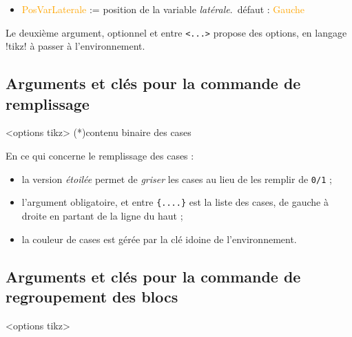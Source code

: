 \documentclass[french,a4paper,11pt]{article}
\newcommand\Cle[1]{{\small\sffamily\textlangle \textcolor{orange}{#1}\textrangle}}
\begin{document}
{\begin{tipblock}
\begin{itemize}
	\hfill~défaut : \Cle{black}
	\item \Cle{PosVarLaterale} := position de la variable \textit{latérale}.\hfill~défaut : \Cle{Gauche}
\end{itemize}

Le deuxième argument, optionnel et entre \texttt{<...>} propose des options, en langage \packagetex!tikz! à passer à l'environnement.
\end{tipblock}

\subsection{Arguments et clés pour la commande de remplissage}

\begin{DemoCode}
\begin{TableKarnaugh}[clés]<options tikz>
	\KarnaughCasesResult(*){contenu binaire des cases}
\end{TableKarnaugh}
\end{DemoCode}

\begin{tipblock}
En ce qui concerne le remplissage des cases :

\begin{itemize}
	\item la version \textit{étoilée} permet de \textit{griser} les cases au lieu de les remplir de \texttt{0/1} ;
	\item l'argument obligatoire, et entre \texttt{\{....\}} est la liste des cases, de gauche à droite en partant de la ligne du haut ;
	\item la couleur de cases est gérée par la clé idoine de l'environnement.
\end{itemize}
\vspace*{-\baselineskip}\leavevmode
\end{tipblock}

\subsection{Arguments et clés pour la commande de regroupement des blocs}

\begin{DemoCode}
\begin{TableKarnaugh}[clés]<options tikz>
\end{TableKarnaugh}
\end{DemoCode}

}
\end{document}
